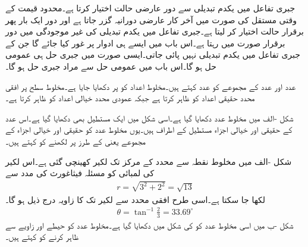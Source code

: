 جبری تفاعل میں یکدم تبدیلی سے دور عارضی حالت اختیار کرتا ہے۔محدود قیمت کے وقتی مستقل کی صورت میں آخر کار عارضی دورانیہ گزر جاتا ہے اور دور ایک بار پھر برقرار حالت اختیار کر لیتا ہے۔جبری تفاعل میں یکدم تبدیلی کی غیر موجودگی میں دور برقرار صورت میں رہتا ہے۔اس باب میں ایسے ہی ادوار پر غور کیا جائے گا جن کے جبری تفاعل میں یکدم تبدیلی نہیں پائی جاتی۔ایسی صورت میں جبری حل ہی عمومی حل ہو گا۔اس باب میں عمومی حل  سے مراد جبری حل ہو گا۔ 
 
 عدد اور  عدد کے مجموعے کو  عدد کہتے ہیں۔مخلوط اعداد کو  پر دکھایا جایا ہے۔مخلوط سطح پر افقی محدد حقیقی اعداد کو ظاہر کرتا ہے جبکہ عمودی محدد خیالی اعداد کو ظاہر کرتا ہے۔

شکل -الف میں مخلوط عدد  دکھایا گیا ہے۔اسی شکل میں ایک مستطیل بھی دکھایا گیا ہے۔اس عدد کے حقیقی اور خیالی اجزاء مستطیل کے اطراف ہیں۔یوں مخلوط عدد کو حقیقی اور خیالی اجزاء کے مجموعے یعنی  کے طرز پر لکھنے کو  کہتے ہیں۔ 

شکل -الف میں مخلوط نقطہ  سے محدد کے مرکز  تک لکیر کھینچی گئی ہے۔اس لکیر کی لمبائی  کو مسئلہ فیثاغورث کی مدد سے
\begin{align*}
r=\sqrt{3^2+2^2}=\sqrt{13}
\end{align*}
لکھا جا سکتا ہے۔اسی طرح افقی محدد سے لکیر تک کا زاویہ درج ذیل ہو گا۔
\begin{align*}
\theta=\tan^{-1}\frac{2}{3}=33.69^{\circ}
\end{align*}
شکل -ب میں اسی مخلوط عدد کو  کی شکل میں دکھایا گیا ہے۔مخلوط عدد کو حیطے اور زاویے سے ظاہر کرنے کو  کہتے ہیں۔

